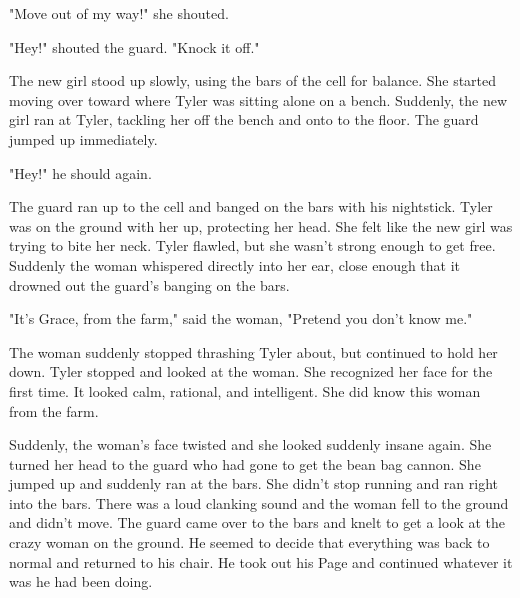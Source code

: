 \documentclass[courier]{sffms}
\begin{document}
"Move out of my way!" she shouted.

"Hey!" shouted the guard. "Knock it off."

The new girl stood up slowly, using the bars of the cell
for balance. She started moving over toward where
Tyler was sitting alone on a bench. Suddenly, the new
girl ran at Tyler, tackling her off the bench and onto
to the floor. The guard jumped up immediately.

"Hey!" he should again.

The guard ran up to the cell and banged on the bars
with his nightstick. Tyler was on the ground with her
up, protecting her head. She felt like the new girl was
trying to bite her neck. Tyler flawled, but she wasn't
strong enough to get free. Suddenly the woman whispered
directly into her ear, close enough that it drowned
out the guard's banging on the bars.

"It's Grace, from the farm," said the woman, "Pretend
you don't know me."

The woman suddenly stopped thrashing Tyler about, but
continued to hold her down. Tyler stopped and looked
at the woman. She recognized her face for the first time.
It looked calm, rational, and intelligent. She did know this
woman from the farm.

Suddenly, the woman's face twisted and she looked
suddenly insane again. She turned her head to the guard
who had gone to get the bean bag cannon. She jumped up
and suddenly ran at the bars. She didn't stop running
and ran right into the bars. There was a loud clanking
sound and the woman fell to the ground and didn't move.
The guard came over to the bars and knelt to get a
look at the crazy woman on the ground. He seemed
to decide that everything was back to normal and returned
to his chair. He took out his Page and continued whatever
it was he had been doing.
\end{document}
